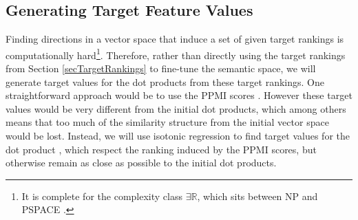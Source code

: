 

\subsection{Generating Target Feature Values}
Finding directions in a vector space that induce a set of given target rankings is computationally hard\footnote{It is complete for the complexity class $\exists\mathbb{R}$, which sits between NP and PSPACE \cite{DBLP:conf/ijcai/SchockaertL15}.}. Therefore, rather than directly using the target rankings from Section \ref{secTargetRankings} to fine-tune the semantic space, we will generate target values for the dot products  from these target rankings. One straightforward approach would be to use the PPMI scores . However these target values would be very different from the initial dot products, which among others means that too much of the similarity structure from the initial vector space would be lost. Instead, we will use isotonic regression to find target values  for the dot product , which respect the ranking induced by the PPMI scores, but otherwise remain as close as possible to the initial dot products. 

